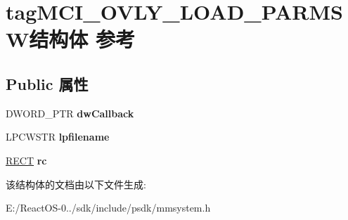 \hypertarget{structtag_m_c_i___o_v_l_y___l_o_a_d___p_a_r_m_s_w}{}\section{tag\+M\+C\+I\+\_\+\+O\+V\+L\+Y\+\_\+\+L\+O\+A\+D\+\_\+\+P\+A\+R\+M\+S\+W结构体 参考}
\label{structtag_m_c_i___o_v_l_y___l_o_a_d___p_a_r_m_s_w}
\subsection*{Public 属性}
\begin{DoxyCompactItemize}
\item 
\mbox{\label{structtag_m_c_i___o_v_l_y___l_o_a_d___p_a_r_m_s_w_a39864bdaf296216b9fc21480cff277bf}} 
D\+W\+O\+R\+D\+\_\+\+P\+TR {\bfseries dw\+Callback}
\item 
\mbox{\label{structtag_m_c_i___o_v_l_y___l_o_a_d___p_a_r_m_s_w_aed9ee9d10aa35afad13901aa9ec4a4ba}} 
L\+P\+C\+W\+S\+TR {\bfseries lpfilename}
\item 
\mbox{\label{structtag_m_c_i___o_v_l_y___l_o_a_d___p_a_r_m_s_w_a0dc2b568f838de8215aad40738da114d}} 
\hyperlink{structtag_r_e_c_t}{R\+E\+CT} {\bfseries rc}
\end{DoxyCompactItemize}


该结构体的文档由以下文件生成\+:\begin{DoxyCompactItemize}
\item 
E\+:/\+React\+O\+S-\/0../sdk/include/psdk/mmsystem.\+h\end{DoxyCompactItemize}

